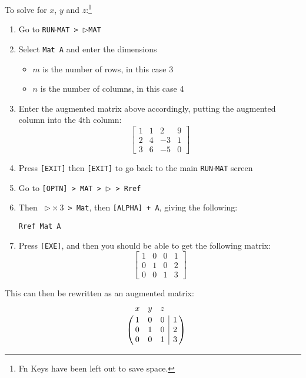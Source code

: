\documentclass[a5paper,draft]{memoir}
\def\VR{\kern-\arraycolsep\strut\vrule &\kern-\arraycolsep}
\def\vr{\kern-\arraycolsep & \kern-\arraycolsep}
\def\code#1{\texttt{#1}}
\begin{document}
To solve for $x$, $y$ and $z$:\footnote{ Fn Keys have been left out to save space.}
\begin{enumerate}
	\item Go to \code{RUN$\cdot$MAT > $\triangleright$MAT}
	\item Select \code{Mat A} and enter the dimensions
	\begin{itemize}
		\item $m$ is the number of rows, in this case 3
		\item $n$ is the number of columns, in this case 4
	\end{itemize}
	\item Enter the augmented matrix above accordingly, putting the augmented column into the 4th column:
	\begin{equation*}
		\left[
			\begin{array}{cccc}
			1 & 1 & 2  & 9 \\  
			2 & 4 & -3 & 1 \\
			3 & 6 & -5 & 0
			\end{array}
		\right]
	\end{equation*}
	\item Press \code{[EXIT]} then \code{[EXIT]} to go back to the main \code{RUN$\cdot$MAT} screen
	\item Go to \code{[OPTN] > MAT > $\triangleright$ > Rref}
	\item Then \code{ $\triangleright \times 3$ > Mat}, then \code{[ALPHA] + A}, giving the following:
	\begin{center}
		\code{Rref Mat A}
	\end{center}
	\item Press \code{[EXE]}, and then you should be able to get the following matrix:
	\begin{equation*}
		\left[
			\begin{array}{cccc}
			1 & 0 & 0 & 1 \\  
			0 & 1 & 0 & 2 \\
			0 & 0 & 1 & 3
			\end{array}
		\right]
	\end{equation*}
\end{enumerate}

This can then be rewritten as an augmented matrix:
\begin{equation*}
\bordermatrix{  & x & y & z & \vr ~ \cr
			  ~ & 1 & 0 & 0 & \VR 1 \cr
			  ~ & 0 & 1 & 0 & \VR 2 \cr
			  ~ & 0 & 0 & 1 & \VR 3 }
\end{equation*}
\end{document}
